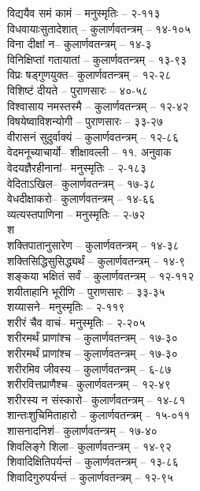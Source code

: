 \begin{raggedright}
\begin{parcolumns}[colwidths={1=.55\textwidth,2=.55\textwidth}]{2}
{विद्ययैव समं कामं	– 	मनुस्मृतिः  – २-११३\\
विधवायाःसुतादेशात्	– 	कुलार्णवतन्त्रम्  – १४-१०५\\
विना दीक्षां न– 	कुलार्णवतन्त्रम्  – १४-३\\
विनिक्षिप्तां गतायातां	– 	कुलार्णवतन्त्रम्  – १३-९३\\
विप्रः षड्गुणयुक्त– 	कुलार्णवतन्त्रम्  – १२-२८\\
विशिष्टं दीयते	– 	पुराणसारः   – ४०-५८\\
विश्वासाय नमस्तस्मै	– 	कुलार्णवतन्त्रम्  – १२-४२\\
विषयेष्वाविशन्योगी	– 	पुराणसारः   – ३३-२७	\\
वीरासनं सुदुर्वाक्यं	– 	कुलार्णवतन्त्रम्  – १२-८६\\
वेदमनूच्याचार्यो– 	शीक्षावल्ली	– ११. अनुवाक\\
वेदयज्ञैरहीनानां– 	मनुस्मृतिः  – २-१८३\\
वेदिताऽखिल– 	 कुलार्णवतन्त्रम्  – १७-३८\\
वेधदीक्षाकरो– 	कुलार्णवतन्त्रम्  – १४-६६\\
व्यत्यस्तपाणिना	– 	मनुस्मृतिः  – २-७२\\
{\large श}\\
शक्तिपातानुसारेण	– 	कुलार्णवतन्त्रम्  – १४-३८\\
शक्तिसिद्धिसुसिद्ध्यर्थं	– 	कुलार्णवतन्त्रम्  – १४-९\\
शङ्कया भक्षितं सर्वं	– 	कुलार्णवतन्त्रम्  – १२-११२\\
शयीताहानि भूरीणि	– 	पुराणसारः   – ३३-३५	\\
शय्यासने– 	मनुस्मृतिः  – २-११९\\
शरीरं चैव वाचं– 	मनुस्मृतिः  – २-२०५\\
शरीरमर्थं प्राणांश्च	– 	कुलार्णवतन्त्रम्  – १७-३०\\
शरीरमर्थं प्राणांश्च	– 	कुलार्णवतन्त्रम्  – १७-३०\\
शरीरमिव जीवस्य	– 	कुलार्णवतन्त्रम्  – ६-८७\\
शरीरवित्तप्राणैश्च– 	कुलार्णवतन्त्रम्  – १२-४९\\
शरीरस्य न संस्कारो– 	कुलार्णवतन्त्रम्  – १४-८१\\
शान्तःशुचिमिताहारो	– 	कुलार्णवतन्त्रम्  – १५-०११\\
शासनादनिशं– 	 कुलार्णवतन्त्रम्  – १७-४०\\
शिवलिङ्गे शिला– 	कुलार्णवतन्त्रम्  – १४-९२\\
शिवादिक्षितिपर्यन्तं	– 	कुलार्णवतन्त्रम्  – १३-८६\\
शिवादिगुरुपर्यन्तं	– 	कुलार्णवतन्त्रम्  – १२-९५\\
}
\end{parcolumns}
\end{raggedright}
